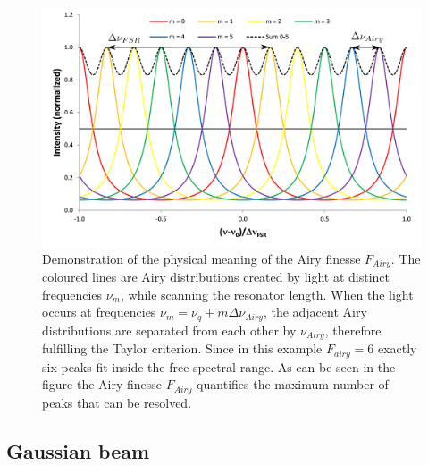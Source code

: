 \begin{figure}[H]
	\centering
	\includegraphics[width=0.8\linewidth]{figures/fabry-perot/Airy_finesse_of_a_Fabry-Perot_interferometer}
	\caption[Demonstration of the physical meaning of the Airy finesse $F_{Airy}$]{Demonstration of the physical meaning of the Airy finesse $F_{Airy}$.
		The coloured lines are Airy distributions created by light at distinct frequencies $\nu_m$, while scanning the resonator length. When the light occurs at frequencies $\nu_m = \nu_q+m\Delta \nu_{Airy}$, the adjacent Airy distributions are separated from each other by $\nu_{Airy}$, therefore fulfilling the Taylor criterion.
		Since in this example $F_{airy}=6$  exactly six peaks fit inside the free spectral range.
		As can be seen in the figure the Airy finesse $F_{Airy}$ quantifies the maximum number of peaks that can be resolved. ~\cite{noauthor_fabryperot_nodate}}
	\label{fig:airyfinesseofafabry-perotinterferometer}
\end{figure}



\subsection{Gaussian beam}
\label{subsec:gaussian-beam}

